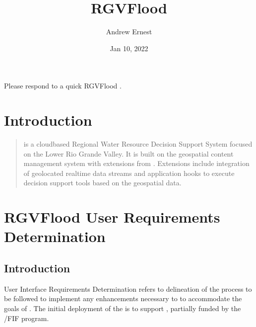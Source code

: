 \documentclass[letterpaper,10pt,english]{sphinxmanual}
\title{RGVFlood}
\date{Jan 10, 2022}
\author{Andrew Ernest}
\begin{document}
\pagestyle{empty}
\sphinxmaketitle
\pagestyle{plain}
\sphinxtableofcontents
\pagestyle{normal}
\label{\detokenize{index::doc}}


\sphinxAtStartPar
Please respond to a quick RGVFlood .


\chapter{Introduction}
\label{\detokenize{introduction:introduction}}\label{\detokenize{introduction::doc}}\begin{quote}

\sphinxAtStartPar
{\hyperref[\detokenize{glossary:term-RGVFlood}]{}} is a cloud\sphinxhyphen{}based Regional Water Resource Decision Support System focused on the Lower Rio Grande Valley. It is built on the  geospatial content management system with extensions from . {\hyperref[\detokenize{glossary:term-REON}]{}} Extensions  include integration of geolocated real\sphinxhyphen{}time data streams and application hooks to execute decision support tools based on the geospatial data.
\end{quote}


\chapter{RGVFlood User Requirements Determination}
\label{\detokenize{requirements/index:rgvflood-user-requirements-determination}}\label{\detokenize{requirements/index::doc}}

\section{Introduction}
\label{\detokenize{requirements/introduction/index:introduction}}\label{\detokenize{requirements/introduction/index::doc}}
\sphinxAtStartPar
User Interface Requirements Determination refers to delineation of the process to be followed to implement any enhancements necessary to {\hyperref[\detokenize{glossary:term-REON.cc}]{}} to accommodate the goals of {\hyperref[\detokenize{glossary:term-REON-WM}]{}}. The initial deployment of the {\hyperref[\detokenize{glossary:term-REON-WM}]{}} is to support {\hyperref[\detokenize{glossary:term-RGVFlood}]{}}, partially funded by the {\hyperref[\detokenize{glossary:term-TWDB}]{}}/FIF program.
\end{document}
